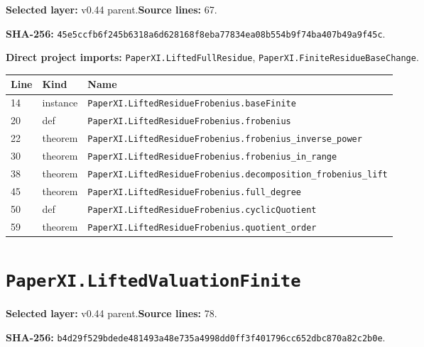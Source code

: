 \documentclass[10pt,oneside]{book}
\begin{document}
\textbf{Selected layer:} v0.44 parent.\quad\textbf{Source lines:} 67.\par\textbf{SHA-256:} {\scriptsize\nolinkurl{45e5ccfb6f245b6318a6d628168f8eba77834ea08b554b9f74ba407b49a9f45c}}.


\textbf{Direct project imports:} \nolinkurl{PaperXI.LiftedFullResidue}, \nolinkurl{PaperXI.FiniteResidueBaseChange}.

\begin{longtable}{@{}p{}p{}p{}@{}}\toprule Line&Kind&Name\\\midrule\endhead

14&instance&\nolinkurl{PaperXI.LiftedResidueFrobenius.baseFinite}\\

20&def&\nolinkurl{PaperXI.LiftedResidueFrobenius.frobenius}\\

22&theorem&\nolinkurl{PaperXI.LiftedResidueFrobenius.frobenius_inverse_power}\\

30&theorem&\nolinkurl{PaperXI.LiftedResidueFrobenius.frobenius_in_range}\\

38&theorem&\nolinkurl{PaperXI.LiftedResidueFrobenius.decomposition_frobenius_lift}\\

45&theorem&\nolinkurl{PaperXI.LiftedResidueFrobenius.full_degree}\\

50&def&\nolinkurl{PaperXI.LiftedResidueFrobenius.cyclicQuotient}\\

59&theorem&\nolinkurl{PaperXI.LiftedResidueFrobenius.quotient_order}\\

\bottomrule\end{longtable}

\section{\texorpdfstring{\nolinkurl{PaperXI.LiftedValuationFinite}}{PaperXI.LiftedValuationFinite}}\label{module:PaperXI.LiftedValuationFinite}

\textbf{Selected layer:} v0.44 parent.\quad\textbf{Source lines:} 78.\par\textbf{SHA-256:} {\scriptsize\nolinkurl{b4d29f529bdede481493a48e735a4998dd0ff3f401796cc652dbc870a82c2b0e}}.
\end{document}
